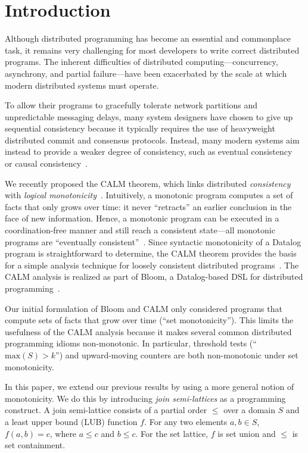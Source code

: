 \section{Introduction}
\label{sec:intro}
Although distributed programming has become an essential and commonplace task,
it remains very challenging for most developers to write correct distributed
programs. The inherent difficulties of distributed computing---concurrency,
asynchrony, and partial failure---have been exacerbated by the scale at which
modern distributed systems must operate.

To allow their programs to gracefully tolerate network partitions and
unpredictable messaging delays, many system designers have chosen to give up
sequential consistency because it typically requires the use of heavyweight
distributed commit and consensus protocols. Instead, many modern systems aim
instead to provide a weaker degree of consistency, such as eventual
consistency~\cite{Terry1995} or causal consistency~\cite{Lloyd2011}.

We recently proposed the CALM theorem, which links distributed
\emph{consistency} with \emph{logical
  monotonicity}~\cite{Alvaro2011,Hellerstein2010}. Intuitively, a monotonic
program computes a set of facts that only grows over time: it never ``retracts''
an earlier conclusion in the face of new information. Hence, a monotonic program
can be executed in a coordination-free manner and still reach a consistent
state---all monotonic programs are ``eventually
consistent''~\cite{Ameloot2011}. Since syntactic monotonicity of a Datalog
program is straightforward to determine, the CALM theorem provides the basis for
a simple analysis technique for loosely consistent distributed
programs~\cite{Alvaro2011}. The CALM analysis is realized as part of Bloom, a
Datalog-based DSL for distributed programming~\cite{bloom}.

Our initial formulation of Bloom and CALM only considered programs that compute
sets of facts that grow over time (``set monotonicity''). This limits the
usefulness of the CALM analysis because it makes several common distributed
programming idioms non-monotonic. In particular, threshold tests
(``$\textrm{max}(S) > k$'') and upward-moving counters are both non-monotonic
under set monotonicity.

In this paper, we extend our previous results by using a more general notion of
monotonicity. We do this by introducing \emph{join semi-lattices} as a
programming construct. A join semi-lattice consists of a partial order $\le$
over a domain $S$ and a least upper bound (LUB) function $f$. For any two
elements $a,b \in S$, $f(a, b) = c$, where $a \le c$ and $b \le c$. For the set
lattice, $f$ is set union and $\le$ is set containment.

